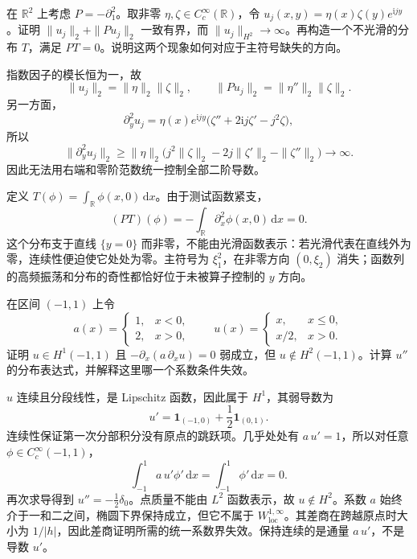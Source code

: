 \begin{exercise}\label{g3:ex:nonelliptic-missing-direction}
	在 \(\mathbb R^2\) 上考虑 \(P=-\partial_1^2\)。取非零 \(\eta,\zeta\in C_c^\infty(\mathbb R)\)，令 \(u_j(x,y)=\eta(x)\zeta(y)e^{\mathrm ijy}\)。证明 \(\|u_j\|_2+\|Pu_j\|_2\) 一致有界，而 \(\|u_j\|_{H^2}\to\infty\)。再构造一个不光滑的分布 \(T\)，满足 \(PT=0\)。说明这两个现象如何对应于主符号缺失的方向。
\end{exercise}
\begin{solution}
	指数因子的模长恒为一，故
	\[
		\|u_j\|_2=\|\eta\|_2\|\zeta\|_2,\qquad
		\|Pu_j\|_2=\|\eta''\|_2\|\zeta\|_2.
	\]
	另一方面，
	\[
		\partial_y^2u_j
		=\eta(x)e^{\mathrm ijy}\bigl(\zeta''+2\mathrm ij\zeta'-j^2\zeta\bigr),
	\]
	所以
	\[
		\|\partial_y^2u_j\|_2
		\ge\|\eta\|_2
		\bigl(j^2\|\zeta\|_2-2j\|\zeta'\|_2-\|\zeta''\|_2\bigr)
		\longrightarrow\infty.
	\]
	因此无法用右端和零阶范数统一控制全部二阶导数。

	定义 \(T(\phi)=\int_{\mathbb R}\phi(x,0)\,\mathrm dx\)。由于测试函数紧支，
	\[
		(PT)(\phi)=-\int_{\mathbb R}\partial_x^2\phi(x,0)\,\mathrm dx=0.
	\]
	这个分布支于直线 \(\{y=0\}\) 而非零，不能由光滑函数表示：若光滑代表在直线外为零，连续性便迫使它处处为零。主符号为 \(\xi_1^2\)，在非零方向 \((0,\xi_2)\) 消失；函数列的高频振荡和分布的奇性都恰好位于未被算子控制的 \(y\) 方向。
\end{solution}

\begin{exercise}\label{g3:ex:jump-coefficient-regularity}
	在区间 \((-1,1)\) 上令
	\[
		a(x)=
		\begin{cases}1,&x<0,\\2,&x>0,\end{cases}
		\qquad
		u(x)=
		\begin{cases}x,&x\le0,\\x/2,&x>0.\end{cases}
	\]
	证明 \(u\in H^1(-1,1)\) 且 \(-\partial_x(a\,\partial_xu)=0\) 弱成立，但 \(u\notin H^2(-1,1)\)。计算 \(u''\) 的分布表达式，并解释这里哪一个系数条件失效。
\end{exercise}
\begin{solution}
	\(u\) 连续且分段线性，是 Lipschitz 函数，因此属于 \(H^1\)，其弱导数为
	\[
		u'=\mathbf1_{(-1,0)}+\frac12\mathbf1_{(0,1)}.
	\]
	连续性保证第一次分部积分没有原点的跳跃项。几乎处处有 \(a\,u'=1\)，所以对任意 \(\phi\in C_c^\infty(-1,1)\)，
	\[
		\int_{-1}^1a\,u'\phi'\,\mathrm dx=\int_{-1}^1\phi'\,\mathrm dx=0.
	\]
	再次求导得到 \(u''=-\tfrac12\delta_0\)。点质量不能由 \(L^2\) 函数表示，故 \(u\notin H^2\)。系数 \(a\) 始终介于一和二之间，椭圆下界保持成立，但它不属于 \(W^{1,\infty}_{\mathrm{loc}}\)。其差商在跨越原点时大小为 \(1/|h|\)，因此差商证明所需的统一系数界失效。保持连续的是通量 \(a\,u'\)，不是导数 \(u'\)。
\end{solution}

